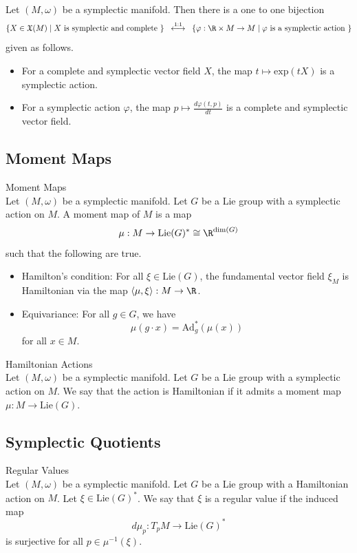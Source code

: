 \documentclass[a4paper]{article}
\begin{document}
\begin{lmm}{}{}\\
Let $(M,\omega)$ be a symplectic manifold. Then there is a one to one bijection $$\{X\in\mathfrak{X}(M)\;|\;X\text{ is symplectic and complete }\}\;\;\overset{1:1}{\longleftrightarrow}\;\;\{\varphi:\R\times M\to M\;|\;\varphi\text{ is a symplectic action }\}$$ given as follows. 
\begin{itemize}
\item For a complete and symplectic vector field $X$, the map $t\mapsto\text{exp}(tX)$ is a symplectic action. 
\item For a symplectic action $\varphi$, the map $p\mapsto\frac{d\varphi(t,p)}{dt}$ is a complete and symplectic vector field. 
\end{itemize}
\end{lmm}

\subsection{Moment Maps}
\begin{defn}{Moment Maps}{}\\
Let $(M,\omega)$ be a symplectic manifold. Let $G$ be a Lie group with a symplectic action on $M$. A moment map of $M$ is a map $$\mu:M\to\text{Lie}(G)^\ast\cong\R^{\dim(G)}$$ such that the following are true. 
\begin{itemize}
\item Hamilton's condition: For all $\xi\in\text{Lie}(G)$, the fundamental vector field $\xi_M$ is Hamiltonian via the map $\langle\mu,\xi\rangle:M\to\R$. 
\item Equivariance: For all $g\in G$, we have $$\mu(g\cdot x)=\text{Ad}_g^\ast(\mu(x))$$ for all $x\in M$. 
\end{itemize}
\end{defn}

\begin{defn}{Hamiltonian Actions}{}\\
Let $(M,\omega)$ be a symplectic manifold. Let $G$ be a Lie group with a symplectic action on $M$. We say that the action is Hamiltonian if it admits a moment map $\mu:M\to\text{Lie}(G)$. 
\end{defn}

\subsection{Symplectic Quotients}
\begin{defn}{Regular Values}{}\\
Let $(M,\omega)$ be a symplectic manifold. Let $G$ be a Lie group with a Hamiltonian action on $M$. Let $\xi\in\text{Lie}(G)^\ast$. We say that $\xi$ is a regular value if the induced map $$d\mu_p:T_pM\to\text{Lie}(G)^\ast$$ is surjective for all $p\in\mu^{-1}(\xi)$. 
\end{defn}
\end{document}
